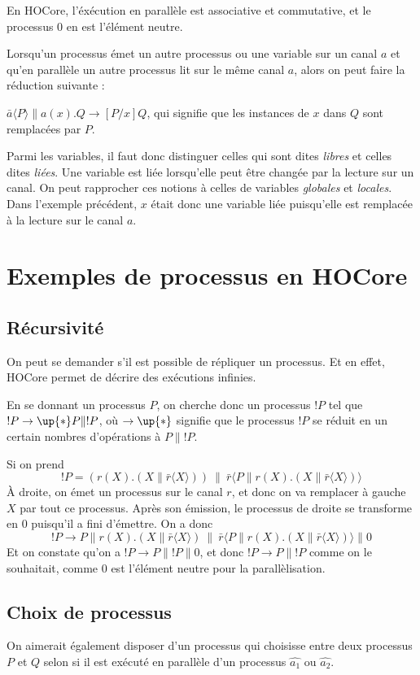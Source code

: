 \documentclass[11pt]{article}
\begin{document}
En HOCore, l'éxécution en parallèle est associative et commutative, et le processus $0$ en est l'élément neutre.

Lorsqu'un processus émet un autre processus ou une variable sur un canal $a$ et qu'en parallèle un autre processus lit sur le même canal $a$, alors on peut faire la réduction suivante :

$\bar{a}\langle P\rangle\|a(x).Q \rightarrow [P/x]Q$, qui signifie que les instances de $x$ dans $Q$ sont remplacées par $P$.

Parmi les variables, il faut donc distinguer celles qui sont dites \textit{libres} et celles dites \textit{liées}. 
Une variable est liée lorsqu'elle peut être changée par la lecture sur un canal. On peut rapprocher ces notions à celles de variables \textit{globales} et \textit{locales}.
Dans l'exemple précédent, $x$ était donc une variable liée puisqu'elle est remplacée à la lecture sur le canal $a$. 



\section{Exemples de processus en HOCore}
\subsection{Récursivité}

On peut se demander s'il est possible de répliquer un processus. Et en effet, HOCore permet de décrire des exécutions infinies.

En se donnant un processus $P$, on cherche donc un processus $!P$ tel que $!P\rightarrow\up{*}P\|!P$, où $\rightarrow\up{*}$ signifie que le processus $!P$ se réduit en un certain nombres d'opérations à $P\|!P$.

Si on prend $$!P = (r(X).(X\|\bar{r}\langle X\rangle))\ \|\ \bar{r}\langle P\|r(X).(X\|\bar{r}\langle X\rangle)\rangle$$
À droite, on émet un processus sur le canal $r$, et donc on va remplacer à gauche $X$ par tout ce processus. Après son émission, le processus de droite se transforme en $0$ puisqu'il a fini d'émettre.
On a donc $$!P\rightarrow P\|r(X).(X\|\bar{r}\langle X\rangle)\ \|\ \bar{r}\langle P\|r(X).(X\|\bar{r}\langle X\rangle)\rangle\| 0$$
Et on constate qu'on a $!P\rightarrow P\|!P\|0$, et donc $!P\rightarrow P\|!P$ comme on le souhaitait, comme $0$ est l'élément neutre pour la parallèlisation.

\subsection{Choix de processus}
On aimerait également disposer d'un processus qui choisisse entre deux processus $P$ et $Q$ selon si il est exécuté en parallèle d'un processus $\hat{a_1}$ ou $\hat{a_2}$.
\end{document}
